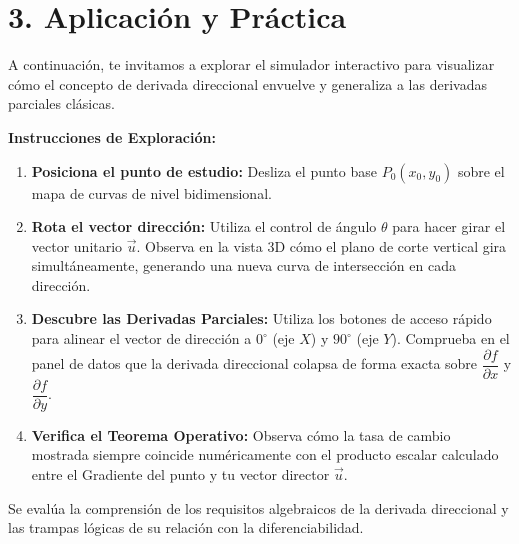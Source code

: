 \documentclass[11pt]{article}
\newenvironment{laboratorio}[1]{%
  \begin{tcolorbox}[colback=purple!5,colframe=purple!75!black,title=Laboratorio Interactivo: #1]%
}{%
  \end{tcolorbox}%
}
\newenvironment{aplicacion}{%
  \section*{3. Aplicación y Práctica}%
}{}
\begin{document}
\begin{aplicacion}
  
  \begin{laboratorio}{Exploración Topográfica de Planos de Corte}
    A continuación, te invitamos a explorar el simulador interactivo para visualizar cómo el concepto de derivada direccional envuelve y generaliza a las derivadas parciales clásicas.
    

    \textbf{Instrucciones de Exploración:}
    \begin{enumerate}
      \item \textbf{Posiciona el punto de estudio:} Desliza el punto base $P_0(x_0, y_0)$ sobre el mapa de curvas de nivel bidimensional.
      \item \textbf{Rota el vector dirección:} Utiliza el control de ángulo $\theta$ para hacer girar el vector unitario $\vec{u}$. Observa en la vista 3D cómo el plano de corte vertical gira simultáneamente, generando una nueva curva de intersección en cada dirección.
      \item \textbf{Descubre las Derivadas Parciales:} Utiliza los botones de acceso rápido para alinear el vector de dirección a $0^\circ$ (eje $X$) y $90^\circ$ (eje $Y$). Comprueba en el panel de datos que la derivada direccional colapsa de forma exacta sobre $\dfrac{\partial f}{\partial x}$ y $\dfrac{\partial f}{\partial y}$.
      \item \textbf{Verifica el Teorema Operativo:} Observa cómo la tasa de cambio mostrada siempre coincide numéricamente con el producto escalar calculado entre el Gradiente del punto y tu vector director $\vec{u}$.
    \end{enumerate}
  \end{laboratorio}

  \vspace{0.5cm}
  Se evalúa la comprensión de los requisitos algebraicos de la derivada direccional y las trampas lógicas de su relación con la diferenciabilidad.


\end{aplicacion}
\end{document}
